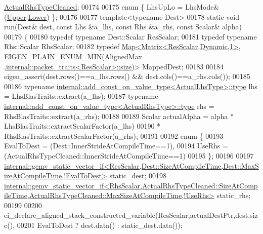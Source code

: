 \begin{DoxyCode}
      \hyperlink{group___sparse_core___module}{ActualRhsTypeCleaned};
00174 
00175   \textcolor{keyword}{enum} \{ LhsUpLo = LhsMode&(\hyperlink{group__enums_gga39e3366ff5554d731e7dc8bb642f83cda6bcb58be3b8b8ec84859ce0c5ac0aaec}{Upper}|\hyperlink{group__enums_gga39e3366ff5554d731e7dc8bb642f83cda891792b8ed394f7607ab16dd716f60e6}{Lower}) \};
00176 
00177   \textcolor{keyword}{template}<\textcolor{keyword}{typename} Dest>
00178   \textcolor{keyword}{static} \textcolor{keywordtype}{void} run(Dest& dest, \textcolor{keyword}{const} Lhs &a\_lhs, \textcolor{keyword}{const} Rhs &a\_rhs, \textcolor{keyword}{const} Scalar& alpha)
00179   \{
00180     \textcolor{keyword}{typedef} \textcolor{keyword}{typename} Dest::Scalar ResScalar;
00181     \textcolor{keyword}{typedef} \textcolor{keyword}{typename} Rhs::Scalar RhsScalar;
00182     \textcolor{keyword}{typedef} \hyperlink{group___core___module_class_eigen_1_1_map}{Map<Matrix<ResScalar,Dynamic,1>}, EIGEN\_PLAIN\_ENUM\_MIN(AlignedMax
      ,\hyperlink{struct_eigen_1_1internal_1_1packet__traits}{internal::packet\_traits<ResScalar>::size})> MappedDest;
00183     
00184     eigen\_assert(dest.rows()==a\_lhs.rows() && dest.cols()==a\_rhs.cols());
00185 
00186     \textcolor{keyword}{typename} \hyperlink{group___sparse_core___module}{internal::add\_const\_on\_value\_type<ActualLhsType>::type}
       lhs = LhsBlasTraits::extract(a\_lhs);
00187     \textcolor{keyword}{typename} \hyperlink{group___sparse_core___module}{internal::add\_const\_on\_value\_type<ActualRhsType>::type}
       rhs = RhsBlasTraits::extract(a\_rhs);
00188 
00189     Scalar actualAlpha = alpha * LhsBlasTraits::extractScalarFactor(a\_lhs)
00190                                * RhsBlasTraits::extractScalarFactor(a\_rhs);
00191 
00192     \textcolor{keyword}{enum} \{
00193       EvalToDest = (Dest::InnerStrideAtCompileTime==1),
00194       UseRhs = (ActualRhsTypeCleaned::InnerStrideAtCompileTime==1)
00195     \};
00196     
00197     
      \hyperlink{struct_eigen_1_1internal_1_1gemv__static__vector__if}{internal::gemv\_static\_vector\_if<ResScalar,Dest::SizeAtCompileTime,Dest::MaxSizeAtCompileTime,!EvalToDest>}
       static\_dest;
00198     
      \hyperlink{struct_eigen_1_1internal_1_1gemv__static__vector__if}{
      internal::gemv\_static\_vector\_if<RhsScalar,ActualRhsTypeCleaned::SizeAtCompileTime,ActualRhsTypeCleaned::MaxSizeAtCompileTime,!UseRhs>}
       static\_rhs;
00199 
00200     ei\_declare\_aligned\_stack\_constructed\_variable(ResScalar,actualDestPtr,dest.size(),
00201                                                   EvalToDest ? dest.data() : static\_dest.data());

\end{DoxyCode}
